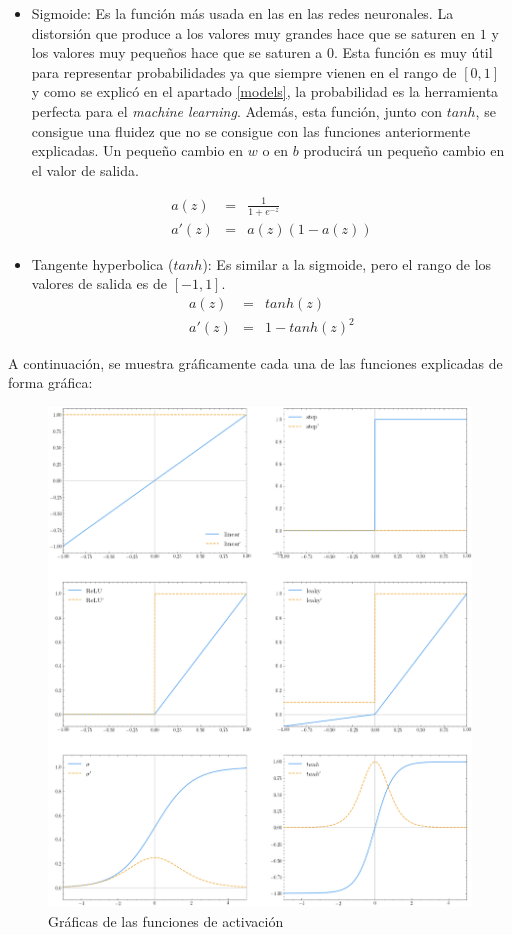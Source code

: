 \begin{itemize}
\item Sigmoide: Es la función más usada en las en las redes neuronales. La distorsión que produce a los valores muy grandes hace que se saturen en $1$ y los valores muy pequeños hace que se saturen a $0$. Esta función es muy útil para representar probabilidades ya que siempre vienen en el rango de $[0, 1]$ y como se explicó en el apartado \ref{models}, la probabilidad es la herramienta perfecta para el \textit{machine learning}. Además, esta función, junto con $tanh$, se consigue una fluidez que no se consigue con las funciones anteriormente explicadas. Un pequeño cambio en $w$ o en $b$ producirá un pequeño cambio en el valor de salida.

\begin{eqnarray}
    a(z) & = & \frac{\mathrm{1} }{\mathrm{1} + e^{-z} } \\
    a'(z) & = & a(z) (1 - a(z))
\end{eqnarray}

\item Tangente hyperbolica ($tanh$): Es similar a la sigmoide, pero el rango de los valores de salida es de $[-1,1]$.
\begin{eqnarray}
    a(z) & = & tanh(z) \\
    a'(z) & = & 1 - tanh(z)^2
\end{eqnarray}


\end{itemize}

A continuación, se muestra gráficamente cada una de las funciones explicadas de forma gráfica:
\begin{figure}[H]
    \centering
    \includegraphics[width=15cm]{images/state-of-art/activation-functions/activation_functions.png}
    \caption{Gráficas de las funciones de activación}
    \label{fig:basicneuron}
\end{figure}

